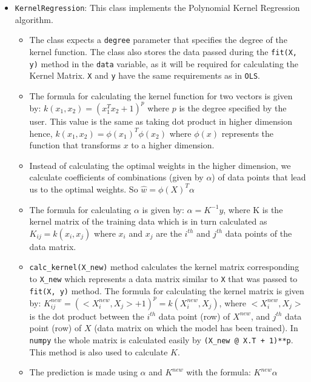 \documentclass[a4paper]{article}
\begin{document}
\begin{itemize}
    \item \verb|KernelRegression|: This class implements the Polynomial Kernel Regression algorithm.
    \begin{itemize}
        \item The class expects a \verb|degree| parameter that specifies the degree of the kernel function. The class also stores the data passed during the \verb|fit(X, y)| method in the \verb|data| variable, as it will be required for calculating the Kernel Matrix. \verb|X| and \verb|y| have the same requirements as in \verb|OLS|.
        
        \item The formula for calculating the kernel function for two vectors is given by: $k(x_1, x_2)=(x_1^T x_2 + 1)^p$ where $p$ is the degree specified by the user. This value is the same as taking dot product in higher dimension hence, $k(x_1, x_2)=\phi(x_1)^T \phi(x_2)$ where $\phi(x)$ represents the function that transforms $x$ to a higher dimension.
        
        \item Instead of calculating the optimal weights in the higher dimension, we calculate coefficients of combinations (given by $\alpha$) of data points that lead us to the optimal weights. So $\hat{w}= \phi(X)^T \alpha$
        
        \item The formula for calculating $\alpha$ is given by: $\alpha=K^{-1}y$, where K is the kernel matrix of the training data which is in turn calculated as \\ 
        $K_{ij}=k(x_i, x_j)$ where $x_i$ and $x_j$ are the $i^{th}$ and $j^{th}$ data points of the data matrix.
        
        \item \verb|calc_kernel(X_new)| method calculates the kernel matrix corresponding to \verb|X_new| which represents a data matrix similar to \verb|X| that was passed to \verb|fit(X, y)| method. The formula for calculating the kernel matrix is given by: $K^{new}_{ij}= (<X^{new}_i, X_j> + 1)^p = k(X^{new}_i, X_j)$, where $<X^{new}_i, X_j>$ is the dot product between the $i^{th}$ data point (row) of $X^{new}$, and $j^{th}$ data point (row) of $X$ (data matrix on which the model has been trained). In \verb|numpy| the whole matrix is calculated easily by \verb|(X_new @ X.T + 1)**p|. This method is also used to calculate $K$.
    
        \item The prediction is made using $\alpha$ and $K^{new}$ with the formula: $K^{new} \alpha$
    

\end{itemize}
\end{itemize}
\end{document}
